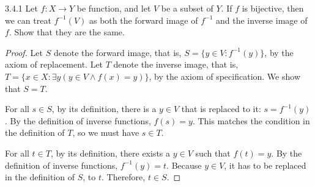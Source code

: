 \begin{exercise}{3.4.1}
	Let $f: X \to Y$ be function, and let $V$ be a subset of $Y$. If $f$ is bijective, then we can treat $f^{-1}(V)$ as both the forward image of $f^{-1}$ and the inverse image of $f$. Show that they are the same.
\end{exercise}
\begin{proof}
	Let $S$ denote the forward image, that is, $S = \{y \in V: f^{-1}(y)\}$, by the axiom of replacement. Let $T$ denote the inverse image, that is, $T = \{x \in X: \exists y (y \in V \wedge f(x) = y)\}$, by the axiom of specification. We show that $S = T$.
	
	For all $s \in S$, by its definition, there is a $y \in V$ that is replaced to it: $s = f^{-1}(y)$. By the definition of inverse functions, $f(s) = y$. This matches the condition in the definition of $T$, so we must have $s \in T$.
	
	For all $t \in T$, by its definition, there exists a $y \in V$ such that $f(t) = y$. By the definition of inverse functions, $f^{-1}(y) = t$. Because $y \in V$, it has to be replaced in the definition of $S$, to $t$. Therefore, $t \in S$.
\end{proof}

